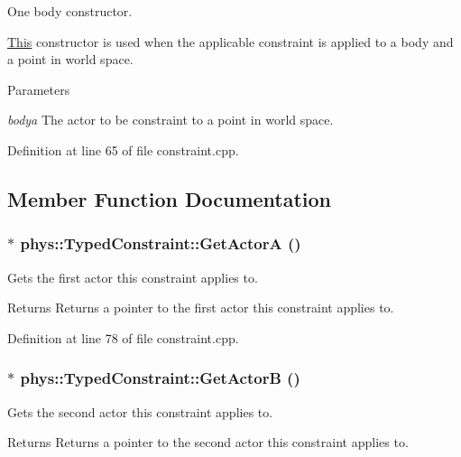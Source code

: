 One body constructor. 

\hyperlink{structThis}{This} constructor is used when the applicable constraint is applied to a body and a point in world space. 
\begin{DoxyParams}{Parameters}
\item[{\em bodya}]The actor to be constraint to a point in world space. \end{DoxyParams}


Definition at line 65 of file constraint.cpp.



\subsection{Member Function Documentation}
\hypertarget{classphys_1_1TypedConstraint_aae01815d877566ae4e100bb481ed2f5e}{
\subsubsection[{GetActorA}]{ $\ast$ phys::TypedConstraint::GetActorA ()}}
\label{d1/d17/classphys_1_1TypedConstraint_aae01815d877566ae4e100bb481ed2f5e}


Gets the first actor this constraint applies to. 

\begin{DoxyReturn}{Returns}
Returns a pointer to the first actor this constraint applies to. 
\end{DoxyReturn}


Definition at line 78 of file constraint.cpp.

\hypertarget{classphys_1_1TypedConstraint_a5d988a4d724ed77ca846417d466e9e1a}{
\subsubsection[{GetActorB}]{ $\ast$ phys::TypedConstraint::GetActorB ()}}
\label{d1/d17/classphys_1_1TypedConstraint_a5d988a4d724ed77ca846417d466e9e1a}


Gets the second actor this constraint applies to. 

\begin{DoxyReturn}{Returns}
Returns a pointer to the second actor this constraint applies to. 
\end{DoxyReturn}


